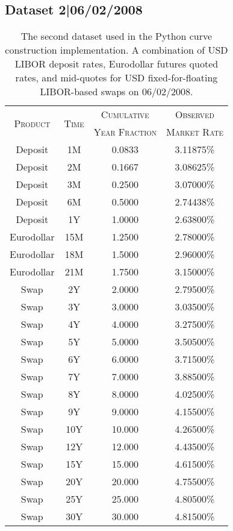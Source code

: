 \subsection*{Dataset 2|06/02/2008}

\FloatBarrier

\begin{table}[h!]
\begin{center}
\begin{tabular}{cccc}

\toprule
\multirow{2}{*}{\textsc{Product}} & \multirow{2}{*}{\textsc{Time}} & \textsc{Cumulative} & \textsc{Observed} \\
 & & \textsc{Year Fraction} & \textsc{Market Rate} \\
\toprule

Deposit & 1M & 0.0833 & 3.11875\% \\
Deposit & 2M & 0.1667 & 3.08625\% \\
Deposit & 3M & 0.2500 & 3.07000\% \\
Deposit & 6M & 0.5000 & 2.74438\% \\
Deposit & 1Y & 1.0000 & 2.63800\% \\

Eurodollar & 15M & 1.2500 & 2.78000\% \\
Eurodollar & 18M & 1.5000 & 2.96000\% \\
Eurodollar & 21M & 1.7500 & 3.15000\% \\

Swap & 2Y & 2.0000 & 2.79500\% \\
Swap & 3Y & 3.0000 & 3.03500\% \\
Swap & 4Y & 4.0000 & 3.27500\% \\
Swap & 5Y & 5.0000 & 3.50500\% \\
Swap & 6Y & 6.0000 & 3.71500\% \\
Swap & 7Y & 7.0000 & 3.88500\% \\
Swap & 8Y & 8.0000 & 4.02500\% \\
Swap & 9Y & 9.0000 & 4.15500\% \\
Swap & 10Y & 10.000 & 4.26500\% \\
Swap & 12Y & 12.000 & 4.43500\% \\
Swap & 15Y & 15.000 & 4.61500\% \\
Swap & 20Y & 20.000 & 4.75500\% \\
Swap & 25Y & 25.000 & 4.80500\% \\
Swap & 30Y & 30.000 & 4.81500\% \\
\toprule

\end{tabular}
\end{center}
\caption[Dataset--06/02/2008]{The second dataset used in the Python curve construction  implementation. A combination of USD LIBOR deposit rates, Eurodollar futures quoted rates, and mid-quotes for USD fixed-for-floating LIBOR-based swaps on 06/02/2008.}
\end{table}

